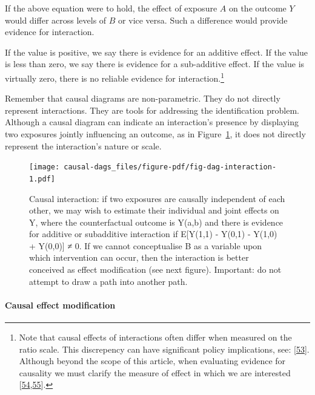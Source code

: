 \documentclass[
  singlecolumn]{article}
\let\oldparagraph\paragraph
\renewcommand{\paragraph}[1]{\oldparagraph{#1}\mbox{}}
\begin{document}
If the above equation were to hold, the effect of exposure \(A\) on the
outcome \(Y\) would differ across levels of \(B\) or vice versa. Such a
difference would provide evidence for interaction.

If the value is positive, we say there is evidence for an additive
effect. If the value is less than zero, we say there is evidence for a
sub-additive effect. If the value is virtually zero, there is no
reliable evidence for interaction.\footnote{Note that causal effects of
  interactions often differ when measured on the ratio scale. This
  discrepency can have significant policy implications, see:
  {[}\protect\hyperlink{ref-vanderweele2014}{53}{]}. Although beyond the
  scope of this article, when evaluating evidence for causality we must
  clarify the measure of effect in which we are interested
  {[}\protect\hyperlink{ref-hernuxe1n2004}{54},\protect\hyperlink{ref-tripepi2007}{55}{]}.}

Remember that causal diagrams are non-parametric. They do not directly
represent interactions. They are tools for addressing the identification
problem. Although a causal diagram can indicate an interaction's
presence by displaying two exposures jointly influencing an outcome, as
in Figure~\ref{fig-dag-interaction}, it does not directly represent the
interaction's nature or scale.

\begin{figure}

{\centering \texttt{[image: causal-dags\_files/figure-pdf/fig-dag-interaction-1.pdf]}

}

\caption{\label{fig-dag-interaction}Causal interaction: if two exposures
are causally independent of each other, we may wish to estimate their
individual and joint effects on Y, where the counterfactual outcome is
Y(a,b) and there is evidence for additive or subadditive interaction if
E{[}Y(1,1) - Y(0,1) - Y(1,0) + Y(0,0){]} ≠ 0. If we cannot conceptualise
B as a variable upon which intervention can occur, then the interaction
is better conceived as effect modification (see next figure). Important:
do not attempt to draw a path into another path.}

\end{figure}

\hypertarget{causal-effect-modification}{%
\paragraph{\texorpdfstring{\textbf{Causal effect
modification}}{Causal effect modification}}\label{causal-effect-modification}}
\end{document}

